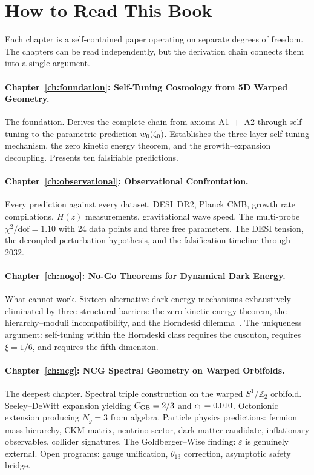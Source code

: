 \section{How to Read This Book}
\label{sec:0-reading}

Each chapter is a self-contained paper operating on separate degrees
of freedom. The chapters can be read independently, but the derivation
chain connects them into a single argument.

\paragraph{Chapter~\ref{ch:foundation}: Self-Tuning Cosmology from 5D
Warped Geometry.}
The foundation. Derives the complete chain from axioms A1~$+$~A2
through self-tuning to the parametric prediction $w_0(\zeta_0)$.
Establishes the three-layer self-tuning mechanism, the zero kinetic
energy theorem, and the growth--expansion decoupling. Presents ten
falsifiable predictions.

\paragraph{Chapter~\ref{ch:observational}: Observational Confrontation.}
Every prediction against every dataset. DESI~DR2, Planck CMB, growth
rate compilations, $H(z)$ measurements, gravitational wave speed. The
multi-probe $\chi^2/\mathrm{dof} = 1.10$ with 24 data points and three
free parameters. The DESI tension, the decoupled perturbation
hypothesis, and the falsification timeline through 2032.

\paragraph{Chapter~\ref{ch:nogo}: No-Go Theorems for Dynamical Dark
Energy.}
What cannot work. Sixteen alternative dark energy mechanisms
exhaustively eliminated by three structural barriers: the zero kinetic
energy theorem, the hierarchy--moduli incompatibility, and the
Horndeski dilemma~\cite{ch1:horndeski74}. The uniqueness argument:
self-tuning within the Horndeski class requires the cuscuton, requires
$\xi = 1/6$, and requires the fifth dimension.

\paragraph{Chapter~\ref{ch:ncg}: NCG Spectral Geometry on Warped
Orbifolds.}
The deepest chapter. Spectral triple construction on the warped
$S^1/\mathbb{Z}_2$ orbifold. Seeley--DeWitt expansion yielding
$C_{\mathrm{GB}} = 2/3$ and $\epsilon_1 = 0.010$. Octonionic extension producing
$N_g = 3$ from algebra. Particle physics predictions: fermion mass
hierarchy, CKM matrix, neutrino sector, dark matter candidate,
inflationary observables, collider signatures. The Goldberger--Wise
finding: $\varepsilon$ is genuinely external. Open programs: gauge
unification, $\theta_{13}$ correction, asymptotic safety bridge.

